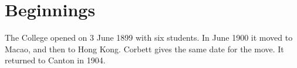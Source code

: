 \section{Beginnings}
The College opened on 3 June 1899 with six students.\cite[9]{ccc1908}
In June 1900 it moved to Macao, and then to Hong Kong.\cite[9]{ccc1908}
Corbett gives the same date for the move.\cite[31]{corbett1963}
It returned to Canton in 1904.\cite[9]{ccc1908}
